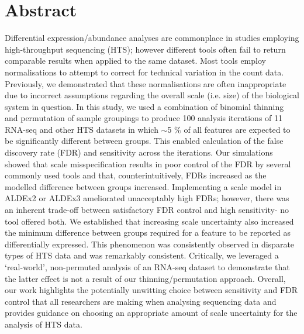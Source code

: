 \documentclass[10pt,letterpaper]{article}
\begin{document}

%
\section*{Abstract}
Differential expression/abundance analyses are commonplace in studies employing high-throughput sequencing (HTS); however different tools often fail to return comparable results when applied to the same dataset. Most tools employ normalisations to attempt to correct for technical variation in the count data. Previously, we demonstrated that these normalisations are often inappropriate due to incorrect assumptions regarding the overall scale (i.e. size) of the biological system in question. In this study, we used a combination of binomial thinning and permutation of sample groupings to produce 100 analysis iterations of 11 RNA-seq and other HTS datasets in which $\sim$5 \% of all features are expected to be significantly different between groups. This enabled calculation of the false discovery rate (FDR) and sensitivity across the iterations. Our simulations showed that scale misspecification results in poor control of the FDR by several commonly used tools and that, counterintuitively, FDRs increased as the modelled difference between groups increased. Implementing a scale model in ALDEx2 or ALDEx3 ameliorated unacceptably high FDRs; however, there was an inherent trade-off between satisfactory FDR control and high sensitivity- no tool offered both. We established that increasing scale uncertainty also increased the minimum difference between groups required for a feature to be reported as differentially expressed. This phenomenon was consistently observed in disparate types of HTS data and was remarkably consistent. Critically, we leveraged a `real-world’, non-permuted analysis of an RNA-seq dataset to demonstrate that the latter effect is not a result of our thinning/permutation approach. Overall, our work highlights the potentially unwitting choice between sensitivity and FDR control that all researchers are making when analysing sequencing data and provides guidance on choosing an appropriate amount of scale uncertainty for the analysis of HTS data.
\end{document}

